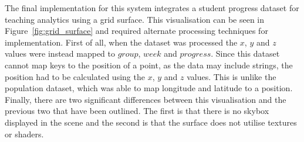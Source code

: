 {	

	The final implementation for this system integrates a student progress dataset for teaching analytics using a grid surface. This visualisation can be seen in Figure~\ref{fig:grid_surface} and required alternate processing techniques for implementation. First of all, when the dataset was processed the $x$, $y$ and $z$ values were instead mapped to $group$, $week$ and $progress$. Since this dataset cannot map keys to the position of a point, as the data may include strings, the position had to be calculated using the $x$, $y$ and $z$ values. This is unlike the population dataset, which was able to map longitude and latitude to a position. Finally, there are two significant differences between this visualisation and the previous two that have been outlined. The first is that there is no skybox displayed in the scene and the second is that the surface does not utilise textures or shaders.

	

	
}

